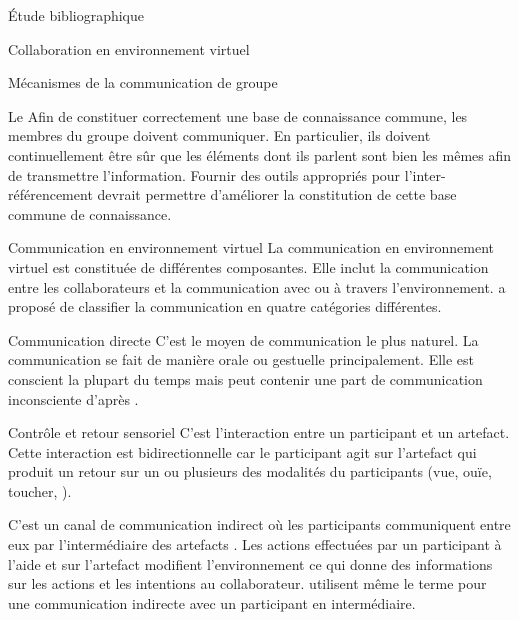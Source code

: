 \documentclass[myfrancais,ngerman,english,frenchb]{mythesis}
\begin{document}
\begin{mychapter}{Étude bibliographique}
\begin{mysection}{Collaboration en environnement virtuel}
\begin{mysubsection}{Mécanismes de la communication de groupe}
\begin{mysubsubsection}{Le \mygrounding}
					Afin de constituer correctement une base de connaissance commune, les membres du groupe doivent communiquer.
					En particulier, ils doivent continuellement être sûr que les éléments dont ils parlent sont bien les mêmes afin de transmettre l'information.
					Fournir des outils appropriés pour l'inter-référencement devrait permettre d'améliorer la constitution de cette base commune de connaissance.
				\end{mysubsubsection}
			\end{mysubsection}
			\begin{mysubsection}{Communication en environnement virtuel}
				La communication en environnement virtuel est constituée de différentes composantes.
				Elle inclut la communication entre les collaborateurs et la communication avec ou à travers l'environnement.
				 a proposé de classifier la communication en quatre catégories différentes.
				\begin{mysubsubsection}{Communication directe}
					C'est le moyen de communication le plus naturel.
					La communication se fait de manière orale ou gestuelle principalement.
					Elle est conscient la plupart du temps mais peut contenir une part de communication inconsciente d'après .
				\end{mysubsubsection}
				\begin{mysubsubsection}{Contrôle et retour sensoriel}
					C'est l'interaction entre un participant et un artefact.
					Cette interaction est bidirectionnelle car le participant agit sur l'artefact qui produit un retour sur un ou plusieurs des modalités du participants (vue, ouïe, toucher, \myetc).
				\end{mysubsubsection}
				\begin{mysubsubsection}{\myFeedthrough}
					C'est un canal de communication indirect où les participants communiquent entre eux par l'intermédiaire des artefacts .
					Les actions effectuées par un participant à l'aide et sur l'artefact modifient l'environnement ce qui donne des informations sur les actions et les intentions au collaborateur.
					 utilisent même le terme \myfeedthrough pour une communication indirecte avec un participant en intermédiaire.
				\end{mysubsubsection}

\end{mysubsection}
\end{mysection}
\end{mychapter}
\end{document}
